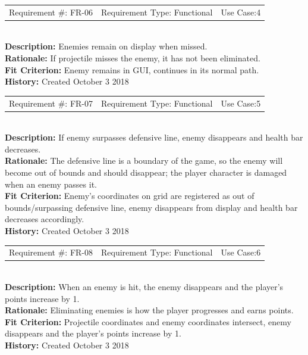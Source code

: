 \documentclass[12pt, titlepage]{article}
\begin{document}
\begin{reqbox}
	\begin{tabular}{c|c|c}
		Requirement \#: FR-06 & Requirement Type: Functional & Use Case:4 \\
	\end{tabular} \\
	\textbf{Description:} Enemies remain on display when missed. \\
	\textbf{Rationale:} If projectile misses the enemy, it has not been eliminated. \\
	\textbf{Fit Criterion:} Enemy remains in GUI, continues in its normal path. \\
	\textbf{History:} Created October 3 2018
\end{reqbox}

\begin{reqbox}
	\begin{tabular}{c|c|c}
		Requirement \#: FR-07 & Requirement Type: Functional & Use Case:5 \\
	\end{tabular} \\
	\textbf{Description:} If enemy surpasses defensive line, enemy disappears and health bar decreases. \\
	\textbf{Rationale:} The defensive line is a boundary of the game, so the enemy will become out of bounds and should disappear; the player character is damaged when an enemy passes it. \\
	\textbf{Fit Criterion:} Enemy's coordinates on grid are registered as out of bounds/surpassing defensive line, enemy disappears from display and health bar decreases accordingly. \\
	\textbf{History:} Created October 3 2018
\end{reqbox}

\begin{reqbox}
	\begin{tabular}{c|c|c}
		Requirement \#: FR-08 & Requirement Type: Functional & Use Case:6 \\
	\end{tabular} \\
	\textbf{Description:} When an enemy is hit, the enemy disappears and the player's points increase by 1. \\
	\textbf{Rationale:} Eliminating enemies is how the player progresses and earns points. \\
	\textbf{Fit Criterion:} Projectile coordinates and enemy coordinates intersect, enemy disappears and the player's points increase by 1. \\
	\textbf{History:} Created October 3 2018
\end{reqbox}
\end{document}

